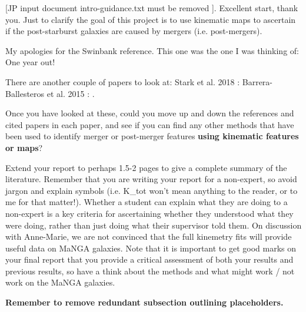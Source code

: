 [JP input document intro-guidance.txt must be removed ]. Excellent start, thank you. Just to clarify the goal of this project is to use kinematic maps to ascertain if the post-starburst galaxies are caused by mergers (i.e. post-mergers). 

My apologies for the Swinbank reference. This one was the one I was thinking of: \citet{2012MNRAS.420..672S} One year out!
 
There are another couple of papers to look at:
Stark et al. 2018 : \citep{2018MNRAS.480.2217S} 
Barrera-Ballesteros et al. 2015 : \citet{2015A&A...582A..21B}.
 
Once you have looked at these, could you move up and down the references and cited papers in each paper, and see if you can find any other methods that have been used to identify merger or post-merger features \textbf{using kinematic features or maps}?
 
Extend your report to perhaps 1.5-2 pages to give a complete summary of the literature.
Remember that you are writing your report for a non-expert, so avoid jargon and explain symbols (i.e. K\_tot won't mean anything to the reader, or to me for that matter!). Whether a student can explain what they are doing to a non-expert is a key criteria for ascertaining whether they understood what they were doing, rather than just doing what their supervisor told them.  On discussion with Anne-Marie, we are not convinced that the full kinemetry fits will provide useful data on MaNGA galaxies. Note that it is important to get good marks on your final report that you provide a critical assessment of both your results and previous results, so have a think about the methods and what might work / not work on the MaNGA galaxies. 

\vspace{6pt}
\textbf{Remember to remove redundant subsection outlining placeholders.}